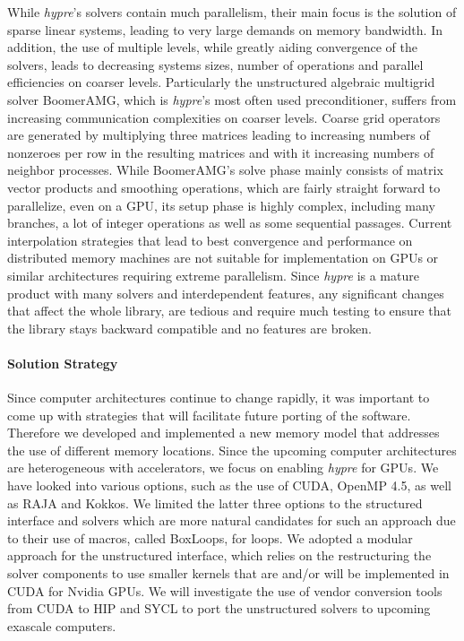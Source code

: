 While {\sl hypre}'s solvers contain much parallelism, their main focus is the solution of sparse linear systems, leading to  very large demands on memory bandwidth. In addition, the use of multiple levels, while greatly aiding convergence of the solvers, leads to decreasing systems sizes, number of operations and parallel efficiencies on coarser levels. Particularly the unstructured algebraic multigrid solver BoomerAMG\cite{HeYa2002}, which is {\sl hypre}'s most often used preconditioner, suffers from increasing communication complexities on coarser levels. Coarse grid operators are generated by multiplying three matrices leading to increasing numbers of nonzeroes per row in the resulting matrices and with it increasing numbers of neighbor processes. While BoomerAMG's solve phase mainly consists of matrix vector products and smoothing operations, which are fairly straight forward to parallelize, even on a GPU, its setup phase is highly complex, including many branches, a lot of integer operations as well as some sequential passages. Current  interpolation strategies that lead to best convergence and performance on distributed memory machines are not suitable for implementation on GPUs or similar architectures requiring extreme parallelism. Since {\sl hypre} is a mature product with many solvers and interdependent features, any significant changes that affect the whole library, are tedious and require much testing to ensure that the library stays backward compatible and no features are broken.

\paragraph{Solution Strategy}

Since computer architectures continue to change rapidly, it was important to come up with strategies that will facilitate future porting of the software. Therefore we developed and implemented a new memory model that addresses the use of different memory locations.
Since the upcoming computer architectures are heterogeneous with accelerators, we focus on enabling {\sl hypre} for GPUs. We have looked into various options, such as the use of CUDA, OpenMP 4.5, as well as RAJA and Kokkos. We limited the latter three options to the structured interface and solvers which are more natural candidates for such an approach due to their use of macros, called BoxLoops, for loops. We adopted a modular approach for the unstructured interface, which relies on the restructuring the solver components to use smaller kernels that are and/or will be implemented in CUDA for Nvidia GPUs. We will investigate the use of vendor conversion tools from CUDA to HIP and SYCL to port the unstructured solvers to upcoming exascale computers.


